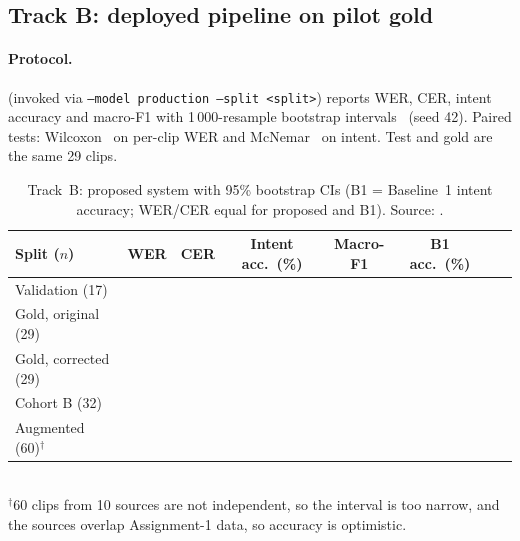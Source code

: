 \documentclass[sigconf,authordraft]{acmart}
\begin{document}
\subsection{Track B: deployed pipeline on pilot gold}
\paragraph{Protocol.}
 (invoked via \texttt{--model production --split <split>}) reports WER, CER, intent accuracy and macro-F1 with 1\,000-resample bootstrap intervals~\cite{Efron1993} (seed 42). Paired tests: Wilcoxon~\cite{Wilcoxon1945} on per-clip WER and McNemar~\cite{McNemar1947} on intent. Test and gold are the same 29 clips.
\begin{table}[t]
\caption{Track~B: proposed system with 95\% bootstrap CIs (B1 = Baseline~1 intent accuracy; WER/CER equal for proposed and B1). Source: .}\label{tab:main}
\begin{tabular}{lrcccccc}
\toprule Split ($n$) & WER & CER & Intent acc.\ (\%) & Macro-F1 & B1 acc.\ (\%) \\ \midrule
Validation (17) & \ValWER{} \ValWERci{} & \ValCER{} \ValCERci{} & \ValAcc{} \ValAccci{} & \ValFone{} \ValFoneci{} & \ValBaccOne{} \ValBaccOneci{} \\
Gold, original (29) & \GoldWER{} \GoldWERci{} & \GoldCER{} \GoldCERci{} & \GoldAcc{} \GoldAccci{} & \GoldFone{} \GoldFoneci{} & \GoldBaccOne{} \GoldBaccOneci{} \\
Gold, corrected (29) & \CorrWER{} \CorrWERci{} & \CorrCER{} \CorrCERci{} & \CorrAcc{} \CorrAccci{} & \CorrFone{} \CorrFoneci{} & \CorrBaccOne{} \CorrBaccOneci{} \\
Cohort B (32) & \CbWER{} \CbWERci{} & \CbCER{} \CbCERci{} & \CbAcc{} \CbAccci{} & \CbFone{} \CbFoneci{} & \CbBaccOne{} \CbBaccOneci{} \\
Augmented (60)$^\dagger$ & \AugWER{} \AugWERci{} & \AugCER{} \AugCERci{} & \AugAcc{} \AugAccci{} & \AugFone{} \AugFoneci{} & \AugBaccOne{} \AugBaccOneci{} \\ \bottomrule
\end{tabular}\\[2pt]
{\footnotesize $^\dagger$60 clips from 10 sources are not independent, so the interval is too narrow, and the sources overlap Assignment-1 data, so accuracy is optimistic.}
\end{table}
\end{document}
